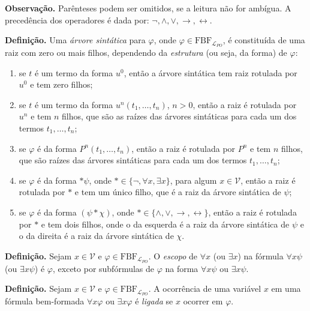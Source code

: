         \textbf{Observação.} Parênteses podem ser omitidos, se a leitura não for ambígua. A precedência dos operadores é dada por: $\neg, \land, \lor, \rightarrow, \leftrightarrow$. 
  
        \textbf{Definição.} Uma \textit{árvore sintática} para $\varphi$, onde $\varphi \in \text{FBF}_{\mathcal{L}_{PO}}$, é constituída de uma raiz com zero ou mais filhos, dependendo da \textit{estrutura} (ou seja, da forma) de $\varphi$:
        
        \begin{enumerate}[left=0.5cm, align=left, nosep]
            \item se $t$ é um termo da forma $u^0$, então a árvore sintática tem raiz rotulada por $u^0$ e tem zero filhos;
            
            \item se $t$ é um termo da forma $u^n(t_1, \ldots, t_n)$, $n > 0$, então a raiz é rotulada por $u^n$ e tem $n$ filhos, que são as raízes das árvores sintáticas para cada um dos termos $t_1, \ldots, t_n$;
            
            \item se $\varphi$ é da forma $P^n(t_1, \ldots, t_n)$, então a raiz é rotulada por $P^n$ e tem $n$ filhos, que são raízes das árvores sintáticas para cada um dos termos $t_1, \ldots, t_n$;
            
            \item se $\varphi$ é da forma $*\psi$, onde $* \in \{\neg, \forall x, \exists x\}$, para algum $x \in \mathcal{V}$, então a raiz é rotulada por $*$ e tem um único filho, que é a raiz da árvore sintática de $\psi$;
            
            \item se $\varphi$ é da forma $(\psi * \chi)$, onde $* \in \{\land, \lor, \rightarrow, \leftrightarrow\}$, então a raiz é rotulada por $*$ e tem dois filhos, onde o da esquerda é a raiz da árvore sintática de $\psi$ e o da direita é a raiz da árvore sintática de $\chi$.
        \end{enumerate}

        \textbf{Definição.} Sejam $x \in \mathcal{V}$ e $\varphi \in \text{FBF}_{\mathcal{L}_{PO}}$. O \textit{escopo} de $\forall x$ (ou $\exists x$) na fórmula $\forall x \psi$ (ou $\exists x \psi$) é $\varphi$, exceto por subfórmulas de $\varphi$ na forma $\forall x \psi$ ou $\exists x \psi$. 
        
        \textbf{Definição.} Sejam $x \in \mathcal{V}$ e $\varphi \in \text{FBF}_{\mathcal{L}_{PO}}$. A ocorrência de uma variável $x$ em uma fórmula bem-formada $\forall x \varphi$ ou $\exists x \varphi$ é \textit{ligada} se $x$ ocorrer em $\varphi$. 
        
